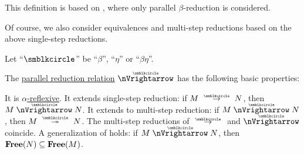 \begin{comments}
  \item This definition is based on \cite[3.2.3]{Barendregt1984}, where only parallel \( \beta \)-reduction is considered.
  \item Of course, we also consider equivalences and multi-step reductions based on the above single-step reductions.
\end{comments}

\begin{proposition}\label{thm:def:parallel_reduction}
  Let \enquote{\( {\anon} \)} be \enquote{\( \beta \)}, \enquote{\( \eta \)} or \enquote{\( \beta\eta \)}.

  The \hyperref[def:parallel_reduction]{parallel reduction relation} \( {\ppred} \) has the following basic properties:
  \begin{thmenum}
     It is \hyperref[def:alpha_reflexive]{\( \alpha \)-reflexive}.
     It extends single-step reduction: if \( M \pred N \), then \( M \ppred N \).
     It extends to multi-step reduction: if \( M \ppred N \), then \( M \pred* N \).
     The multi-step reductions of \( {\pred} \) and \( {\ppred} \) coincide.
     A generalization of  holds: if \( M \ppred N \), then \( \op*{Free}(N) \subseteq \op*{Free}(M) \).
  \end{thmenum}
\end{proposition}
